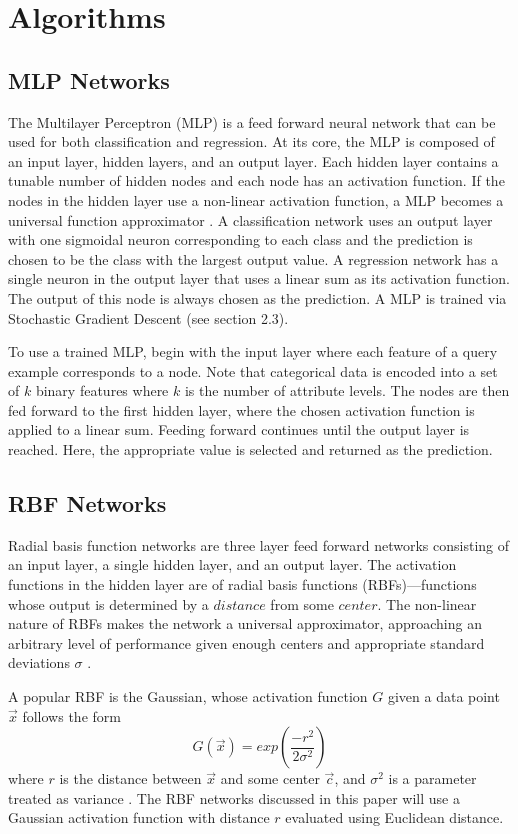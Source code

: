 \documentclass[twoside,11pt]{article}
\begin{document}
\section{Algorithms}

\subsection{MLP Networks}
The Multilayer Perceptron (MLP) is a feed forward neural network that can be used for both classification and regression.
At its core, the MLP is composed of an input layer, hidden layers, and an output layer. Each hidden layer contains a tunable number of hidden nodes and each node has an activation function. If the nodes in the hidden layer use a non-linear activation function, a MLP becomes a universal function approximator \citep{svozil1997ffnn}.
A classification network uses an output layer with one sigmoidal neuron corresponding to each class and the prediction is chosen to be the class with the largest output value. A regression network has a single neuron in the output layer that uses a linear sum as its activation function. The output of this node is always chosen as the prediction.
A MLP is trained via Stochastic Gradient Descent (see section 2.3).

To use a trained MLP, begin with the input layer where each feature of a query example corresponds to a node. Note that categorical data is encoded into a set of $k$ binary features where $k$ is the number of attribute levels.
The nodes are then fed forward to the first hidden layer, where the chosen activation function is applied to a linear sum. Feeding forward continues until the output layer is reached. Here, the appropriate value is selected and returned as the prediction.

\subsection{RBF Networks}
	Radial basis function networks are three layer feed forward networks consisting of an input layer, a single hidden layer, and an output layer. The activation functions in the hidden layer are of radial basis functions (RBFs)---functions whose output is determined by a $distance$ from some $center$. The non-linear nature of RBFs makes the network a universal approximator, approaching an arbitrary level of performance given enough centers and appropriate standard deviations $\sigma$ \citep{rbf}.

	A popular RBF is the Gaussian, whose activation function $G$ given a data point $\vec{x}$ follows the form
	$$G(\vec{x}) = exp({\frac{-r^2}{2\sigma^2}})$$
	where $r$ is the distance between $\vec x$ and some center $\vec c$, and $\sigma^2$ is a parameter treated as variance \citep{rbf}. The RBF networks discussed in this paper will use a Gaussian activation function with distance $r$ evaluated using Euclidean distance.
\end{document}

